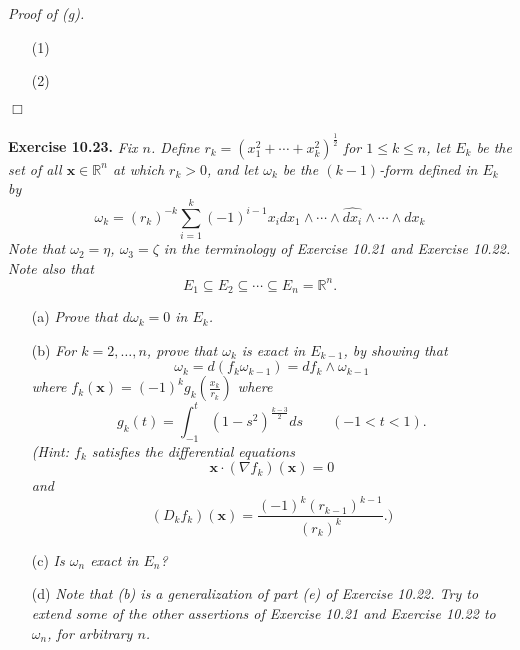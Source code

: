 \documentclass{article}
\begin{document}
\emph{Proof of (g).}
\begin{enumerate}
\item[(1)]
\item[(2)]

\end{enumerate}
$\Box$ \\\\






\textbf{Exercise 10.23.}
\emph{Fix $n$.
Define $r_k = (x_1^2+\cdots+x_k^2)^{\frac{1}{2}}$ for $1 \leq k \leq n$,
let $E_k$ be the set of all $\mathbf{x} \in \mathbb{R}^n$ at which $r_k > 0$,
and let $\omega_k$ be the $(k-1)$-form defined in $E_k$ by
\[
  \omega_k
  = (r_k)^{-k}
    \sum_{i=1}^{k} (-1)^{i-1} x_i dx_1 \wedge \cdots
    \wedge \widehat{dx_i} \wedge \cdots \wedge dx_k
\]
Note that $\omega_2 = \eta$, $\omega_3 = \zeta$ in the terminology of
Exercise 10.21 and Exercise 10.22.
Note also that}
\[
  E_1 \subseteq E_2 \subseteq \cdots \subseteq E_n = \mathbb{R}^n.
\]
\begin{enumerate}
\item[(a)]
  \emph{Prove that $d\omega_k = 0$ in $E_k$.}

\item[(b)]
  \emph{For $k=2,\ldots,n$, prove that $\omega_k$ is exact in $E_{k-1}$,
  by showing that
  \[
    \omega_k = d(f_k\omega_{k-1}) = df_k \wedge \omega_{k-1}
  \]
  where $f_k(\mathbf{x}) = (-1)^k g_k\left( \frac{x_k}{r_k} \right)$
  where
  \[
    g_k(t) = \int_{-1}^{t} (1-s^2)^{\frac{k-3}{2}} ds
    \qquad
    (-1 < t < 1).
  \]
  (Hint: $f_k$ satisfies the differential equations
  \[
    \mathbf{x} \cdot (\nabla f_k)(\mathbf{x}) = 0
  \]
  and
  \[
    (D_k f_k)(\mathbf{x}) = \frac{(-1)^k(r_{k-1})^{k-1}}{(r_k)^k}.)
  \]}

\item[(c)]
  \emph{Is $\omega_n$ exact in $E_n$?}

\item[(d)]
  \emph{Note that (b) is a generalization of part (e) of Exercise 10.22.
  Try to extend some of the other assertions of Exercise 10.21 and Exercise 10.22
  to $\omega_n$, for arbitrary $n$.} \\
\end{enumerate}
\end{document}
